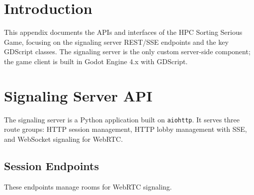 
\label{app:c}

\section{Introduction}
\label{app:c:introduction}

This appendix documents the APIs and interfaces of the HPC Sorting Serious Game, focusing on the signaling server REST/SSE endpoints and the key GDScript classes. The signaling server is the only custom server-side component; the game client is built in Godot Engine 4.x with GDScript.

\section{Signaling Server API}
\label{app:c:signaling-server-api}

The signaling server is a Python application built on \texttt{aiohttp}. It serves three route groups: HTTP session management, HTTP lobby management with SSE, and WebSocket signaling for WebRTC.

\subsection{Session Endpoints}
\label{app:c:session-endpoints}

These endpoints manage rooms for WebRTC signaling.

